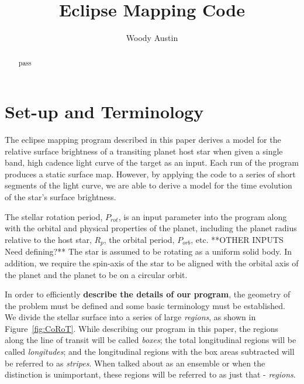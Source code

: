 \documentclass[iop]{emulateapj}
\begin{document}
\title{Eclipse Mapping Code}
\author{Woody Austin}

\begin{abstract}
pass
\end{abstract}
\maketitle


\section{Set-up and Terminology \label{terminology}}
The eclipse mapping program described in this paper derives a model for the relative surface
brightness of a transiting planet host star when given a single band, high cadence light curve
of the target as an input.  Each run of the program produces a static surface map.
However, by applying the code to a series of short segments of the 
light curve, we are able to derive a model for the time evolution of the star's surface brightness.  

The stellar rotation period, $P_{rot}$, is an input parameter into the program 
along with the orbital and physical properties of the planet, including the
planet radius relative to the host star, $R_{p}$, the orbital period, $P_{orb}$, etc.   **OTHER INPUTS Need defining?**
The star is assumed to be rotating as a uniform solid body.  In addition, we require the spin-axis of the star   
to be aligned with the orbital axis of the planet and the planet to be on a circular orbit.  

In order to efficiently {\bf describe the details of our program}, the geometry
of the problem must be defined and some basic terminology must be established.
We divide the stellar surface into a series of large {\it regions}, as shown in Figure~\ref{fig:CoRoT}.  
While describing our program in this paper, the regions along the line of transit will be called {\it boxes}; 
the total longitudinal regions will be called {\it longitudes};
and the longitudinal regions with the box areas subtracted will be referred to as {\it stripes}.
When talked about as an ensemble or when the distinction is unimportant, these regions will be referred to as just that - {\it regions}. 
\end{document}

